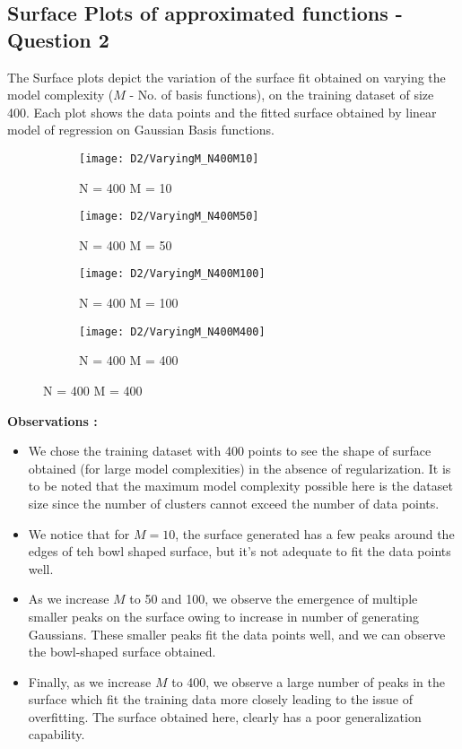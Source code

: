 \documentclass{article}
\begin{document}
\subsection{Surface Plots of approximated functions - Question 2}
\begin{flushleft}
The Surface plots depict the variation of the surface fit obtained on varying the model complexity ($M$ - No. of basis functions), on the training dataset of size 400. Each plot shows the data points and the fitted surface obtained by linear model of regression on Gaussian Basis functions.

\end{flushleft}
\begin{figure}[H]

\begin{subfigure}{.5\textwidth}
\centering
\texttt{[image: D2/VaryingM\_N400M10]}
\caption{N = 400 M = 10}
\end{subfigure}
\begin{subfigure}{.5\textwidth}
\texttt{[image: D2/VaryingM\_N400M50]}
\caption{N = 400 M = 50}
\end{subfigure}


\begin{subfigure}{.5\textwidth}
\centering
\texttt{[image: D2/VaryingM\_N400M100]}
\caption{N = 400 M = 100}
\end{subfigure}
\begin{subfigure}{.5\textwidth}
\texttt{[image: D2/VaryingM\_N400M400]}
\caption{N = 400 M = 400}
\end{subfigure}


\end{figure}

\textbf{Observations : \newline}
\begin{itemize}
\item We chose the training dataset with 400 points to see the shape of surface obtained (for large model complexities) in the absence of regularization. It is to be noted that the maximum model complexity possible here is the dataset size since the number of clusters cannot exceed the number of data points.
\item We notice that for $M=10$, the surface generated has a few peaks around the edges of teh bowl shaped surface, but it's not adequate to fit the data points well.

\item As we increase $M$ to 50 and 100, we observe the emergence of multiple smaller peaks on the surface owing to increase in number of generating Gaussians. These smaller peaks fit the data points well, and we can observe the bowl-shaped surface obtained.
\item Finally, as we increase $M$ to 400, we observe a large number of peaks in the surface which fit the training data more closely leading to the issue of overfitting. The surface obtained here, clearly has a poor generalization capability.
\end{itemize}
\end{document}
